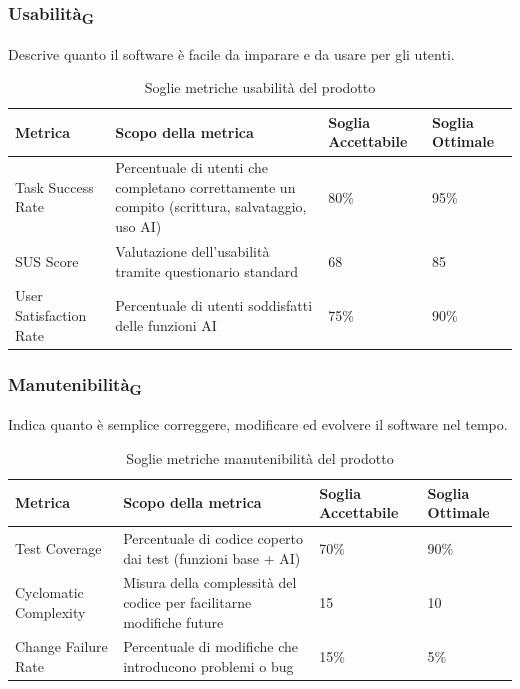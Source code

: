 \documentclass[11pt,a4paper]{article}
\begin{document}
\subsubsection{Usabilità\textsubscript{G}}
Descrive quanto il software è facile da imparare e da usare per gli utenti.
\begin{table}[H]
\centering
\renewcommand{\arraystretch}{1.5}
\begin{tabular}{|M{0.25\textwidth}|M{0.35\textwidth}|M{0.15\textwidth}|M{0.15\textwidth}|}
\hline
\textbf{Metrica} & \textbf{Scopo della metrica} & \textbf{Soglia Accettabile} & \textbf{Soglia Ottimale} \\
\hline
Task Success Rate & Percentuale di utenti che completano correttamente un compito (scrittura, salvataggio, uso AI) & 80\% & 95\% \\ \hline
SUS Score & Valutazione dell’usabilità tramite questionario standard & 68 & 85 \\ \hline
User Satisfaction Rate & Percentuale di utenti soddisfatti delle funzioni AI & 75\% & 90\% \\
\hline
\end{tabular}
\caption{Soglie metriche usabilità del prodotto}
\end{table}

\subsubsection{Manutenibilità\textsubscript{G}}
Indica quanto è semplice correggere, modificare ed evolvere il software nel tempo.
\begin{table}[H]
\centering
\renewcommand{\arraystretch}{1.5}
\begin{tabular}{|M{0.25\textwidth}|M{0.35\textwidth}|M{0.15\textwidth}|M{0.15\textwidth}|}
\hline
\textbf{Metrica} & \textbf{Scopo della metrica} & \textbf{Soglia Accettabile} & \textbf{Soglia Ottimale} \\
\hline
Test Coverage & Percentuale di codice coperto dai test (funzioni base + AI) & 70\% & 90\% \\ \hline
Cyclomatic Complexity & Misura della complessità del codice per facilitarne modifiche future & 15 & 10 \\ \hline
Change Failure Rate & Percentuale di modifiche che introducono problemi o bug & 15\% & 5\% \\
\hline
\end{tabular}
\caption{Soglie metriche manutenibilità del prodotto}
\end{table}
\end{document}
